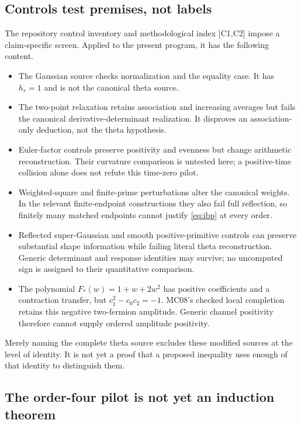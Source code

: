 \documentclass[11pt,letterpaper]{article}
\numberwithin{equation}{section}
\theoremstyle{remark}
\newcommand{\evid}[1]{\textsf{[#1]}}
\begin{document}
\subsection{Controls test premises, not labels}

The repository control inventory and methodological index
\evid{C1,C2} impose a claim-specific screen. Applied to the present
program, it has the following content.
\begin{itemize}
\item The Gaussian source checks normalization and the equality case.
It has $h_r=1$ and is not the canonical theta source.
\item The two-point relaxation retains association and increasing
averages but fails the canonical derivative-determinant realization.
It disproves an association-only deduction, not the theta hypothesis.
\item Euler-factor controls preserve positivity and evenness but change
arithmetic reconstruction. Their curvature comparison is untested here;
a positive-time collision alone does not refute this time-zero pilot.
\item Weighted-square and finite-prime perturbations alter the canonical
weights. In the relevant finite-endpoint constructions they also fail
full reflection, so finitely many matched endpoints cannot justify
\eqref{eq:ibp} at every order.
\item Reflected super-Gaussian and smooth positive-primitive controls
can preserve substantial shape information while failing literal theta
reconstruction. Generic determinant and response identities may survive;
no uncomputed sign is assigned to their quantitative comparison.
\item The polynomial $F_*(w)=1+w+2w^2$ has positive coefficients and
a contraction transfer, but $c_1^2-c_0c_2=-1$. MC08's checked local
completion retains this negative two-fermion amplitude. Generic channel
positivity therefore cannot supply ordered amplitude positivity.
\end{itemize}
Merely naming the complete theta source excludes these modified sources
at the level of identity. It is not yet a proof that a proposed
inequality uses enough of that identity to distinguish them.

\subsection{The order-four pilot is not yet an induction theorem}
\end{document}
